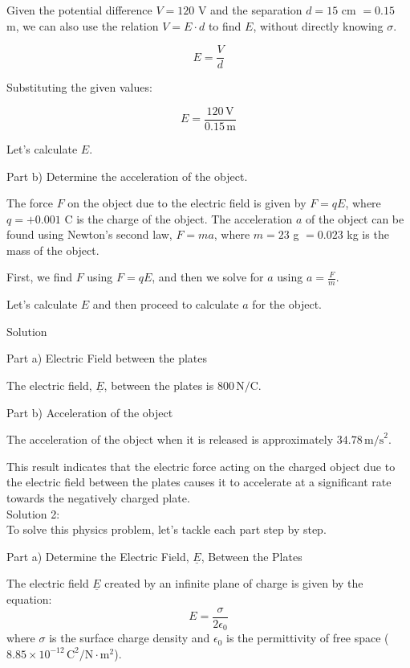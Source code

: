 \documentclass[a4paper,11pt]{article}
\begin{document}
Given the potential difference \( V = 120 \) V and the separation \( d = 15 \) cm \( = 0.15 \) m, we can also use the relation \( V = E \cdot d \) to find \( E \), without directly knowing \( \sigma \).

\[ E = \frac{V}{d} \]

Substituting the given values:

\[ E = \frac{120 \, \text{V}}{0.15 \, \text{m}} \]

Let's calculate \( E \).

Part b) Determine the acceleration of the object.

The force \( F \) on the object due to the electric field is given by \( F = qE \), where \( q = +0.001 \) C is the charge of the object. The acceleration \( a \) of the object can be found using Newton's second law, \( F = ma \), where \( m = 23 \) g \( = 0.023 \) kg is the mass of the object.

First, we find \( F \) using \( F = qE \), and then we solve for \( a \) using \( a = \frac{F}{m} \).

Let's calculate \( E \) and then proceed to calculate \( a \) for the object.

Solution

Part a) Electric Field between the plates

The electric field, \( \underline{E} \), between the plates is \( 800 \, \text{N/C} \).

Part b) Acceleration of the object

The acceleration of the object when it is released is approximately \( 34.78 \, \text{m/s}^2 \). 

This result indicates that the electric force acting on the charged object due to the electric field between the plates causes it to accelerate at a significant rate towards the negatively charged plate. \\

\noindent Solution 2: \\

To solve this physics problem, let's tackle each part step by step.

Part a) Determine the Electric Field, \( \underline{E} \), Between the Plates

The electric field \( \underline{E} \) created by an infinite plane of charge is given by the equation:
\[ E = \frac{\sigma}{2 \epsilon_0} \]
where \( \sigma \) is the surface charge density and \( \epsilon_0 \) is the permittivity of free space (\( 8.85 \times 10^{-12} \, \text{C}^2/\text{N}\cdot\text{m}^2 \)).
\end{document}
